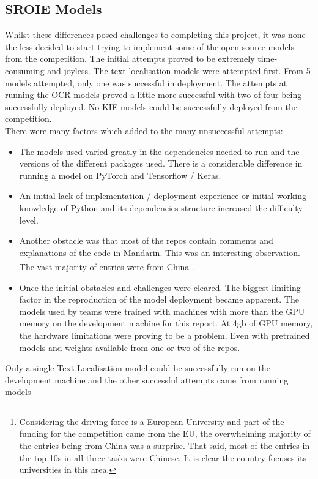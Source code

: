 \subsection{SROIE Models}
Whilst these differences posed challenges to completing this project, it was none-the-less decided to start trying to implement some of the open-source models
from the competition. The initial attempts proved to be extremely time-consuming and joyless. The text localisation models were attempted first. From
5 models attempted, only one was successful in deployment.
\bigbreak
The attempts at running the OCR models proved a little more successful with two of four being successfully deployed. No KIE models could be successfully
deployed from the competition.\\
There were many factors which added to the many unsuccessful attempts:
\begin{itemize}
	\item The models used varied greatly in the dependencies needed to run and the versions of the different packages used. There is a considerable
	      difference in running a model on PyTorch and Tensorflow / Keras.
	\item An initial lack of implementation / deployment experience or initial working knowledge of Python and its dependencies structure
	      increased the difficulty level.
	\item Another obstacle was that most of the repos contain comments and explanations of the code in Mandarin. This was an interesting observation.
	      The vast majority of entries were from China\footnote{Considering the driving force is a European University and part of the funding for the competition came
		      from the EU, the overwhelming majority of the entries being from China was a surprise. That said, most of the entries in the top 10s in all three tasks
		      were Chinese. It is clear the country focuses its universities in this area.}.
	\item Once the initial obstacles and challenges were cleared. The biggest limiting factor in the reproduction of the model deployment became apparent.
	      The models used by teams were trained with machines with more than the GPU memory on the development machine for this report. At 4gb of GPU memory, the
	      hardware limitations were proving to be a problem. Even with pretrained models and weights available from one or two of the repos.
\end{itemize}
Only a single Text Localisation model could be successfully run on the development machine and the other successful attempts came from running models
